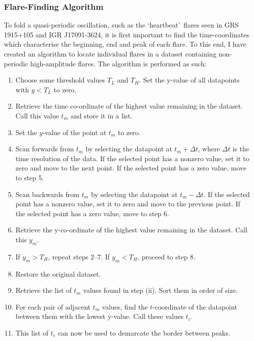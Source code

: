\subsubsection{Flare-Finding Algorithm}
\label{sec:Flares}

\par To fold a quasi-periodic oscillation, such as the `heartbeat'\indexrho\ flares seen in GRS 1915+105 and IGR J17091-3624, it is first important to find the time-coordinates which characterise the beginning, end and peak of each flare.  To this end, I have created an algorithm to locate individual flares in a dataset containing non-periodic high-amplitude flares. The algorithm is performed as such:

\begin{enumerate}
  \item Choose some threshold values $T_L$ and $T_H$.  Set the y-value of all datapoints with $y<T_L$ to zero.
  \item Retrieve the time co-ordinate of the highest value remaining in the dataset.  Call this value $t_m$ and store it in a list.
  \item Set the $y$-value of the point at $t_m$ to zero.
  \item Scan forwards from $t_m$ by selecting the datapoint at $t_m+\Delta t$, where $\Delta t$ is the time resolution of the data.  If the selected point has a nonzero value, set it to zero and move to the next point.  If the selected point has a zero value, move to step 5.
  \item Scan backwards from $t_m$ by selecting the datapoint at $t_m-\Delta t$.  If the selected point has a nonzero value, set it to zero and move to the previous point.  If the selected point has a zero value, move to step 6.
  \item Retrieve the y-co-ordinate of the highest value remaining in the dataset.  Call this $y_m$.
  \item If $y_m>T_H$, repeat steps 2--7.  If $y_m<T_H$, proceed to step 8.
  \item Restore the original dataset.
  \item Retrieve the list of $t_m$ values found in step (ii).  Sort them in order of size.
  \item For each pair of adjacent $t_m$ values, find the $t$-coordinate of the datapoint between them with the lowest y-value.  Call these values $t_c$.
  \item This list of $t_c$ can now be used to demarcate the border between peaks.
\end{enumerate}

